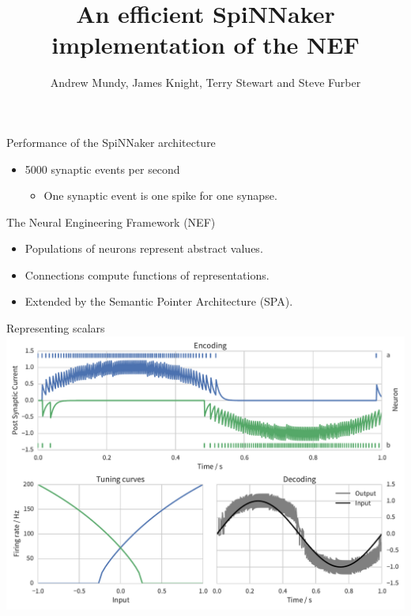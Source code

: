 \documentclass[t]{beamer}
\title{An efficient SpiNNaker implementation of the NEF}
\author{Andrew Mundy, James Knight, Terry Stewart and Steve Furber}
\begin{document}
  \maketitle

  \begin{frame}{Performance of the SpiNNaker architecture}
    \begin{itemize}
      \item 5000 synaptic events per second
      \begin{itemize}
        \item One synaptic event is one spike for one synapse.
      \end{itemize}
    \end{itemize}
  \end{frame}

  \begin{frame}{The Neural Engineering Framework (NEF)}
    \begin{itemize}
      \item Populations of neurons represent abstract values.
      \item Connections compute functions of representations.
      \item Extended by the Semantic Pointer Architecture (SPA).
    \end{itemize}
  \end{frame}

  \begin{frame}[plain]{Representing scalars}
    \vfill
    \includegraphics[width=\textwidth]{encoding_decoding}
    \vfill
  \end{frame}
\end{document}
